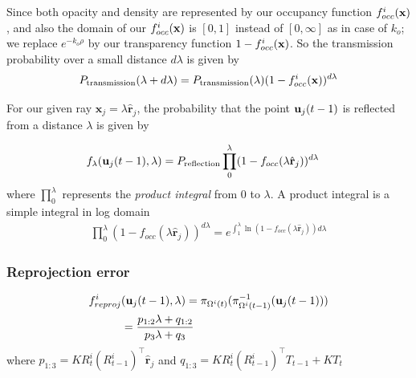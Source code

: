 \documentclass[10pt,twocolumn,letterpaper]{article}
\begin{document}
Since both opacity and density are represented by our occupancy function
$f^i_{occ}(\mathbf{x})$, and also the domain of our $f^i_{occ}(\mathbf{x})$ is $[0, 1]$ instead of $[0,
\infty]$ as in case of $k_o$; we replace $e^{-k_o\rho}$ by our transparency
function $1 - f^i_{occ}(\mathbf{x})$. So the transmission probability over a small distance
$d\lambda$ is given by
\begin{align}
  P_{\text{transmission}}(\lambda + d\lambda) =
  P_{\text{transmission}}(\lambda) (1-f^i_{occ}(\mathbf{x}))^{d\lambda}
\end{align}
\newcommand{\ray}{\hat{\mathbf{r}}_j}
\newcommand{\occfray}{f_{occ}(\lambda\ray)}

For our given ray $\mathbf{x}_j = \lambda \ray$, the probability that the point
$\mathbf{u}_j(t-1)$ is reflected from a distance $\lambda$ is given by

\newcommand{\lambdadist}{f_{\lambda}(\trackpj{t-1}, \lambda)}
\begin{align}
  \lambdadist &= P_{\text{reflection}}
  \prod_{0}^{\lambda} (1 - f_{occ}(\lambda \ray))^{d\lambda} %
\end{align}
where $\prod_{0}^{\lambda}$ represents the \emph{product integral} from $0$ to
$\lambda$. A product integral is a simple integral in log domain
\begin{align}
  \prod_{0}^{\lambda} (1 - f_{occ}(\lambda \ray))^{d\lambda} =
  e^{\int_{1}^{\lambda} \ln{(1 - f_{occ}(\lambda \ray))}{d\lambda}}
\end{align}


\subsubsection{Reprojection error}

\begin{align}
  f^{i}_{reproj}&(\mathbf{u}_j(t-1), \lambda) =
  \pi_{\Omega^{i}(t)}(\pi^{-1}_{\Omega^{i}(t-1)}(\mathbf{u}_j(t-1)))\\
  &= \frac
  {p_{1:2}\lambda + q_{1:2}}
  {p_{3}\lambda + q_{3}}
\end{align}
where $p_{1:3} = KR^i_t(R^i_{t-1})^\top\ray$ and
$q_{1:3} = KR^i_t(R^i_{t-1})^\top T_{t-1} + KT_t$
\end{document}
